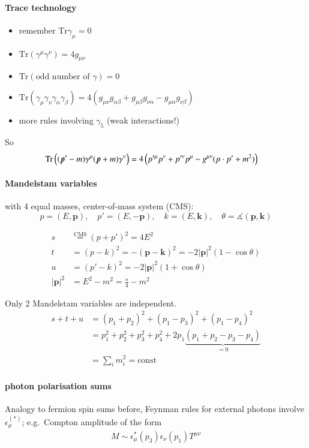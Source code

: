 \paragraph{Trace technology}
\begin{itemize}
	\item remember $\text{Tr} \gamma_\mu = 0 $
	\item $\text{Tr}(\gamma^\mu \gamma^\nu) = 4g_{\mu\nu}$
	\item $\text{Tr}(\text{odd number of } \gamma) = 0$
	\item $\text{Tr}(\gamma_\mu \gamma_\nu \gamma_\alpha \gamma_\beta) = 4 \left( g_{\mu\nu}g_{\alpha\beta} + g_{\mu\beta}g_{\nu\alpha} - g_{\mu\alpha} g_{\nu\beta} \right)$
	\item more rules involving $\gamma_5$ (weak interactions!)
\end{itemize}

So
\begin{align*}
	\text{Tr} \left( (\slashed{p}' - m)\gamma^\mu (\slashed{p}+m)\gamma^\nu \right) &= 4 \left( p'^\mu p^\nu + p'^\nu p^\mu - g^{\mu\nu}(p\cdot p' + m^2) \right)
\end{align*}

\paragraph{Mandelstam variables}
with 4 equal masses, center-of-mass system (CMS): 
$$p=(E,\pmb{p}), \quad p'=(E,-\pmb{p}),\quad k = (E, \pmb{k}),\quad \theta = \measuredangle (\pmb{p}, \pmb{k})$$

\begin{align}
	s &\stackrel{\text{CMS}}{=} (p+p')^2 = 4E^2 \\
	t &=  (p-k)^2 = -(\pmb{p}-\pmb{k})^2 = -2 |\pmb{p}|^2 (1-\cos{\theta}) \\
	u &= (p' - k)^2 = -2 |\pmb{p}|^2 (1+\cos{\theta})\\
	|\pmb{p}|^2 &= E^2 - m^2 = \frac{s}{4} - m^2
\end{align}

Only 2 Mandelstam variables are independent.
\begin{align*}
	s + t + u &= (p_1 + p_2)^2 + (p_1 - p_3)^2 + (p_1 - p_4)^2 \\
				&= p_1^2 + p_2^2 +p_3^2 + p_4^2 + 2 p_1 \underbrace{(p_1 + p_2 - p_3 - p_4)}_{=0} \\
				&= \sum_i m_i^2 = \text{const}
\end{align*}

\paragraph{photon polarisation sums}
Analogy to fermion spin sums before, Feynman rules for external photons involve $\epsilon^(*)_\mu$; e.g.~Compton amplitude of the form 
\begin{align*}
	M \sim \epsilon^*_\mu (p_3) \epsilon_\nu (p_1) T^{\mu\nu}
\end{align*}

